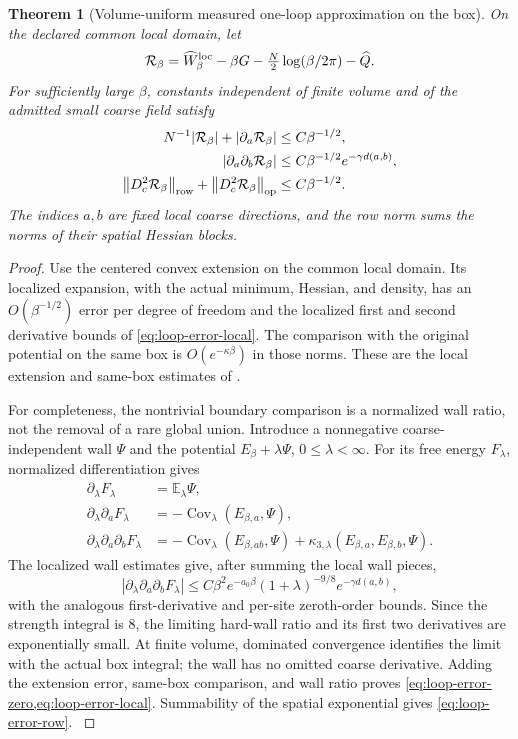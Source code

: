 \documentclass[11pt,oneside,openany]{book}
\newtheorem{theorem}{Theorem}[chapter]
\theoremstyle{definition}
\theoremstyle{remark}
\newcommand{\E}{\mathbb E}
\newcommand{\Cov}{\operatorname{Cov}}
\newcommand{\op}{\mathrm{op}}
\newcommand{\norm}[1]{\left\lVert#1\right\rVert}
\newcommand{\src}[2]{\cite[#2]{#1}}
\begin{document}
\begin{theorem}[Volume-uniform measured one-loop approximation on the box]
\label{thm:uniform-local-loop}
On the declared common local domain, let
\[
 \mathcal R_\beta=\widehat W_\beta^{\rm loc}-\beta G
                  -\tfrac N2\log(\beta/2\pi)-\widehat Q.
\]
For sufficiently large $\beta$, constants independent of finite volume
and of the admitted small coarse field satisfy
\begin{align}
 N^{-1}|\mathcal R_\beta|+|\partial_a\mathcal R_\beta|
      &\le C\beta^{-1/2},\label{eq:loop-error-zero}\\
 |\partial_a\partial_b\mathcal R_\beta|
      &\le C\beta^{-1/2}e^{-\gamma d(a,b)},\label{eq:loop-error-local}\\
 \norm{D_c^2\mathcal R_\beta}_{\rm row}
       +\norm{D_c^2\mathcal R_\beta}_{\op}
      &\le C\beta^{-1/2}.\label{eq:loop-error-row}
\end{align}
The indices $a,b$ are fixed local coarse directions, and the row norm
sums the norms of their spatial Hessian blocks.
\end{theorem}
\begin{proof}
Use the centered convex extension on the common local domain. Its
localized expansion, with the actual minimum, Hessian, and density,
has an $O(\beta^{-1/2})$ error per degree of freedom and the localized
first and second derivative bounds of \cref{eq:loop-error-local}.
The comparison with the original potential on the same box is
$O(e^{-\kappa\beta})$ in those norms. These are the local extension
and same-box estimates of \src{F12}{V10--V11}.

For completeness, the nontrivial boundary comparison is a normalized
wall ratio, not the removal of a rare global union. Introduce a
nonnegative coarse-independent wall $\Psi$ and the potential
$E_\beta+\lambda\Psi$, $0\le\lambda<\infty$. For its free energy
$F_\lambda$, normalized differentiation gives
\begin{align*}
 \partial_\lambda F_\lambda&=\E_\lambda\Psi,\\
 \partial_\lambda\partial_aF_\lambda
              &=-\Cov_\lambda(E_{\beta,a},\Psi),\\
 \partial_\lambda\partial_a\partial_bF_\lambda
              &=-\Cov_\lambda(E_{\beta,ab},\Psi)
                +\kappa_{3,\lambda}(E_{\beta,a},E_{\beta,b},\Psi).
\end{align*}
The localized wall estimates give, after summing the local wall pieces,
\[
 |\partial_\lambda\partial_a\partial_bF_\lambda|
 \le C\beta^2e^{-a_0\beta}(1+\lambda)^{-9/8}
                                      e^{-\gamma d(a,b)},
\]
with the analogous first-derivative and per-site zeroth-order bounds.
Since the strength integral is $8$, the limiting hard-wall ratio and
its first two derivatives are exponentially small. At finite volume,
dominated convergence identifies the limit with the actual box integral;
the wall has no omitted coarse derivative. Adding the extension error,
same-box comparison, and wall ratio proves
\cref{eq:loop-error-zero,eq:loop-error-local}. Summability of the
spatial exponential gives \cref{eq:loop-error-row}.
\src{F12}{V12}
\end{proof}
\end{document}
